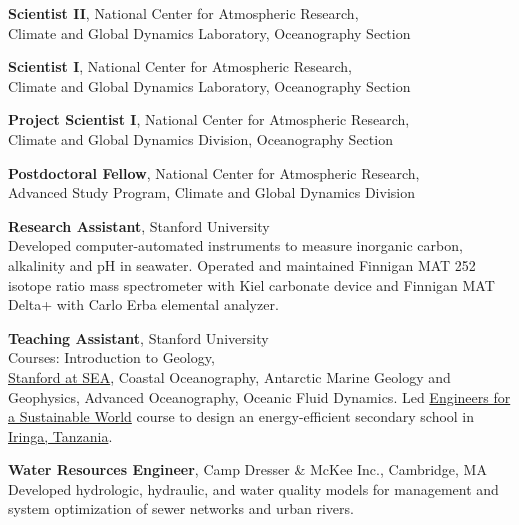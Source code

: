 \documentclass[11pt]{article}
\begin{document}
\begin{description}[style=multiline,leftmargin=2.5cm,font=\normalfont]
\item[2018--present] \textbf{Scientist II},
	{National Center for Atmospheric Research}, \\
	{Climate and Global Dynamics Laboratory},
	{Oceanography Section}

\item[2014--2018] \textbf{Scientist I},
	{National Center for Atmospheric Research}, \\
	{Climate and Global Dynamics Laboratory},
	{Oceanography Section}

\item[2012--2014] \textbf{Project Scientist I},
	{National Center for Atmospheric Research}, \\
	{Climate and Global Dynamics Division},
	{Oceanography Section}

\item[2010--2012] \textbf{Postdoctoral Fellow},
	{National Center for Atmospheric Research}, \\
	{Advanced Study Program}, {Climate and Global Dynamics Division}

\item[2005--2010] \textbf{Research Assistant}, Stanford University\\
	Developed computer-automated instruments to measure
	inorganic carbon, alkalinity and pH in seawater.
	Operated and maintained Finnigan MAT 252 isotope ratio mass spectrometer
	with Kiel carbonate device and Finnigan MAT Delta+ with Carlo Erba elemental analyzer.

\item[2004--2009] \textbf{Teaching Assistant}, Stanford University \\
	Courses: Introduction to Geology,\\
	\href{http://stanford.sea.edu/}{Stanford at SEA},
	Coastal Oceanography, Antarctic Marine Geology and Geophysics,
	Advanced Oceanography, Oceanic Fluid Dynamics.
	Led \href{http://esw.stanford.edu}{Engineers for a Sustainable World} course to
	design an energy-efficient secondary school in
	\href{http://g.co/maps/d9q9a}{Iringa, Tanzania}.

\item[2003--2004] \textbf{Water Resources Engineer},
	{Camp Dresser \& McKee Inc.}, Cambridge, MA\\
	Developed hydrologic, hydraulic, and water quality models for
	management and system optimization of sewer networks and urban rivers.


\end{description}
\end{document}
